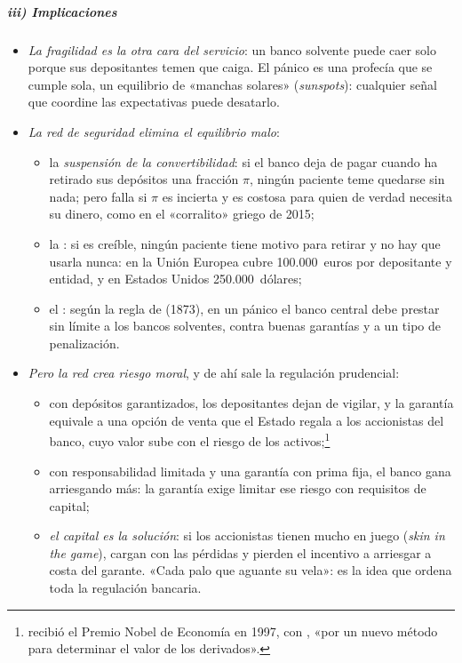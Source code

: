 \documentclass[11pt]{article}
\begin{document}
\subparagraph{iii) Implicaciones}

\begin{itemize}
\item \emph{La fragilidad es la otra cara del servicio}: un banco solvente puede caer solo porque sus depositantes temen que caiga. El pánico es una profecía que se cumple sola, un equilibrio de «manchas solares» (\emph{sunspots}): cualquier señal que coordine las expectativas puede desatarlo.
\item \emph{La red de seguridad elimina el equilibrio malo}:
  \begin{itemize}
  \item la \emph{suspensión de la convertibilidad}: si el banco deja de pagar cuando ha retirado sus depósitos una fracción $\pi$, ningún paciente teme quedarse sin nada; pero falla si $\pi$ es incierta y es costosa para quien de verdad necesita su dinero, como en el «corralito» griego de 2015;
  \item la : si es creíble, ningún paciente tiene motivo para retirar y no hay que usarla nunca: en la Unión Europea cubre 100.000~euros por depositante y entidad, y en Estados Unidos 250.000~dólares\nocite{UE2014DGSD,FDIC2026Insurance};
  \item el : según la regla de  (1873), en un pánico el banco central debe prestar sin límite a los bancos solventes, contra buenas garantías y a un tipo de penalización\nocite{Bagehot1873}.
  \end{itemize}
\item \emph{Pero la red crea riesgo moral}, y de ahí sale la regulación prudencial:
  \begin{itemize}
  \item con depósitos garantizados, los depositantes dejan de vigilar, y la garantía equivale a una opción de venta que el Estado regala a los accionistas del banco, cuyo valor sube con el riesgo de los activos\nocite{Merton1977Analytic};\footnote{ recibió el Premio Nobel de Economía en 1997, con , «por un nuevo método para determinar el valor de los derivados»\nocite{Nobel1997Prensa}.}
  \item con responsabilidad limitada y una garantía con prima fija, el banco gana arriesgando más: la garantía exige limitar ese riesgo con requisitos de capital\nocite{KarekenWallace1978};
  \item \emph{el capital es la solución}: si los accionistas tienen mucho en juego (\emph{skin in the game}), cargan con las pérdidas y pierden el incentivo a arriesgar a costa del garante. «Cada palo que aguante su vela»: es la idea que ordena toda la regulación bancaria.
  \end{itemize}
\end{itemize}
\end{document}

